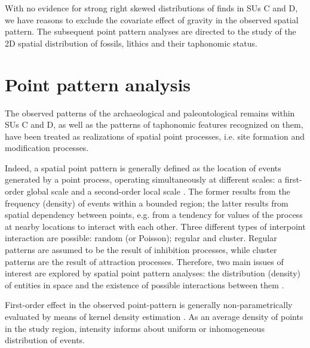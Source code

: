 \documentclass[review,authoryear]{elsarticle} %
\begin{document}
With no evidence for strong right skewed distributions of finds in SUs C and D, we have reasons to exclude the covariate effect of gravity in the observed spatial pattern. The subsequent point pattern analyses are directed to the study of the 2D spatial distribution of fossils, lithics and their taphonomic status.

\section{Point pattern analysis}

The observed patterns of the archaeological and paleontological remains within SUs C and D, as well as the patterns of taphonomic features recognized on them, have been treated as realizations of spatial point processes, i.e. site formation and modification processes.

Indeed, a spatial point pattern is generally defined as the location of events generated by a point process, operating simultaneously at different scales: a first-order global scale and a second-order local scale \citep{Bailey1995}. The former results from the frequency (density) of events within a bounded region; the latter results from spatial dependency between points, e.g. from a tendency for values of the process at nearby locations to interact with each other. Three different types of interpoint interaction are possible: random (or Poisson); regular and cluster. Regular patterns are assumed to be the result of inhibition processes, while cluster patterns are the result of attraction processes. Therefore, two main issues of interest are explored by spatial point pattern analyses: the distribution (density) of entities in space and the existence of possible interactions between them \citep{Ord1972}.

First-order effect in the observed point-pattern is generally non-parametrically evaluated by means of kernel density estimation \citep{Diggle1985}. As an average density of points in the study region, intensity informs about uniform or inhomogeneous distribution of events.
\end{document}
